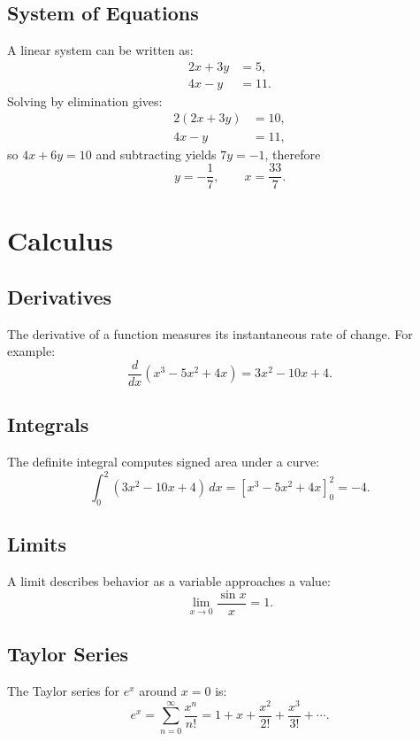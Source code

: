 \documentclass[11pt]{article}
\begin{document}
\subsection{System of Equations}
A linear system can be written as:
\begin{align}
    2x + 3y &= 5,\\
    4x - y &= 11.
\end{align}
Solving by elimination gives:
\begin{align}
    2(2x + 3y) &= 10,\\
    4x - y &= 11,
\end{align}
so $4x + 6y = 10$ and subtracting yields $7y = -1$, therefore
\begin{equation}
    y = -\frac{1}{7}, \qquad x = \frac{33}{7}.
\end{equation}

\newpage

\section{Calculus}
\subsection{Derivatives}
The derivative of a function measures its instantaneous rate of change. For example:
\begin{equation}
    \frac{d}{dx} \left( x^3 - 5x^2 + 4x \right) = 3x^2 - 10x + 4.
\end{equation}

\subsection{Integrals}
The definite integral computes signed area under a curve:
\begin{equation}
    \int_{0}^{2} (3x^2 - 10x + 4) \, dx = \left[ x^3 - 5x^2 + 4x \right]_{0}^{2} = -4.
\end{equation}

\subsection{Limits}
A limit describes behavior as a variable approaches a value:
\begin{equation}
    \lim_{x \to 0} \frac{\sin x}{x} = 1.
\end{equation}

\subsection{Taylor Series}
The Taylor series for $e^x$ around $x=0$ is:
\begin{equation}
    e^x = \sum_{n=0}^{\infty} \frac{x^n}{n!} = 1 + x + \frac{x^2}{2!} + \frac{x^3}{3!} + \cdots.
\end{equation}
\end{document}
